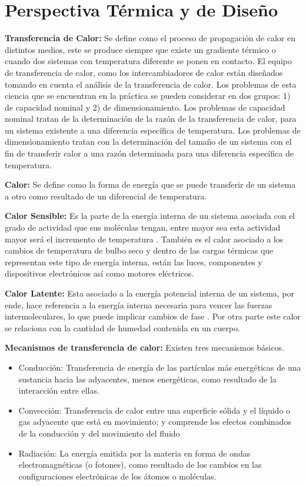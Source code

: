 \section{Perspectiva Térmica y de Diseño}
\textbf{Transferencia de Calor:} Se define como el proceso de propagación de calor en distintos medios, este se produce siempre que existe un gradiente térmico o cuando dos sistemas con temperatura diferente se ponen en contacto. El equipo de transferencia de calor, como los intercambiadores de calor están diseñados tomando en cuenta el análisis de la transferencia de calor. Los problemas de esta ciencia que se encuentran en la práctica se pueden considerar en dos grupos: 1) de capacidad nominal y 2) de dimensionamiento. Los problemas de capacidad nominal tratan de la determinación de la razón de la transferencia de calor, para un sistema existente a una diferencia específica de temperatura. Los problemas de dimensionamiento tratan con la determinación del tamaño de un sistema con el fin de transferir calor a una razón determinada para una diferencia específica de temperatura. \cite{cengel}

\textbf{Calor:} Se define como la forma de energía que se puede transferir de un sistema a otro como resultado de un diferencial de temperatura. \cite{cengel} 

\textbf{Calor Sensible:} Es la parte de la energía interna de un sistema asociada con el grado de actividad que sus moléculas tengan, entre mayor sea esta actividad mayor será el incremento de temperatura \cite{cengel}. También es el calor asociado a los cambios de temperatura de bulbo seco y dentro de las cargas térmicas que representan este tipo de energía interna, están las luces, componentes y dispositivos electrónicos así como motores eléctricos. \cite{apc}

\textbf{Calor Latente:} Esta asociado a la energía potencial interna de un sistema, por ende, hace referencia a la energía interna necesaria para vencer las fuerzas intermoleculares, lo que puede implicar cambios de fase \cite{cengel}. Por otra parte este calor se relaciona con la cantidad de humedad contenida en un cuerpo. \cite{apc}

\textbf{Mecanismos de transferencia de calor:} Existen tres mecanismos básicos.\cite{cengel}

\begin{itemize}
    \item Conducción: Transferencia de energía de las partículas más energéticas de una sustancia hacia las adyacentes, menos energéticas, como resultado de la interacción entre ellas.
    \item Convección: Transferencia de calor entre una superficie sólida y el líquido o gas adyacente que está en movimiento; y comprende los efectos combinados de la conducción y del movimiento del fluido
    \item Radiación: La energía emitida por la materia en forma de ondas electromagnéticas (o fotones), como resultado de los cambios en las configuraciones electrónicas de los átomos o moléculas.
\end{itemize}

